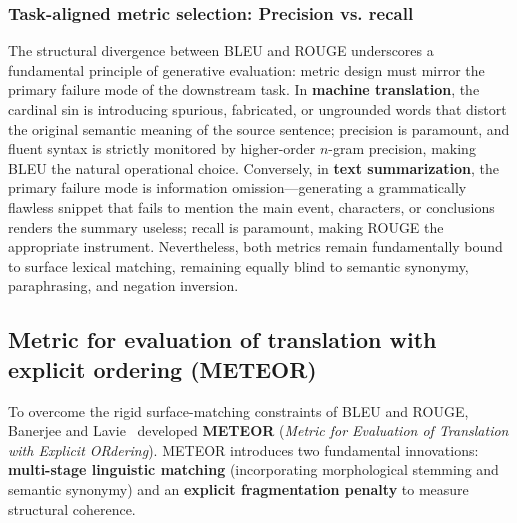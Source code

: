 \documentclass[../../main.tex]{subfiles}
\begin{document}
\subsubsection{Task-aligned metric selection: Precision vs. recall}
The structural divergence between BLEU and ROUGE underscores a fundamental principle of generative evaluation: metric design must mirror the primary failure mode of the downstream task. In \textbf{machine translation}, the cardinal sin is introducing spurious, fabricated, or ungrounded words that distort the original semantic meaning of the source sentence; precision is paramount, and fluent syntax is strictly monitored by higher-order $n$-gram precision, making BLEU the natural operational choice. Conversely, in \textbf{text summarization}, the primary failure mode is information omission---generating a grammatically flawless snippet that fails to mention the main event, characters, or conclusions renders the summary useless; recall is paramount, making ROUGE the appropriate instrument. Nevertheless, both metrics remain fundamentally bound to surface lexical matching, remaining equally blind to semantic synonymy, paraphrasing, and negation inversion.

\subsection{Metric for evaluation of translation with explicit ordering (METEOR)}
\label{subsec:meteor}

To overcome the rigid surface-matching constraints of BLEU and ROUGE, Banerjee and Lavie~\cite{banerjee2005meteor} developed \textbf{METEOR} (\textit{Metric for Evaluation of Translation with Explicit ORdering}). METEOR introduces two fundamental innovations: \textbf{multi-stage linguistic matching} (incorporating morphological stemming and semantic synonymy) and an \textbf{explicit fragmentation penalty} to measure structural coherence.
\end{document}
